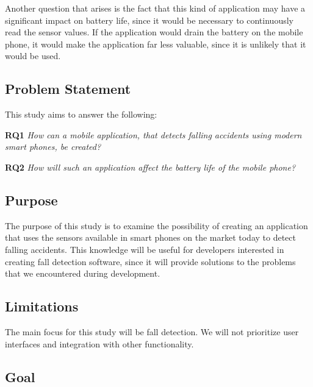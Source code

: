 \documentclass[12pt, a4paper, onecolumn]{article}
\begin{document}
		Another question that arises is the fact that this kind of application may have a significant impact on battery life, since it would be necessary to continuously read the sensor values. If the application would drain the battery on the mobile phone, it would make the application far less valuable, since it is unlikely that it would be used.
		
		\subsection{Problem Statement}
		
		This study aims to answer the following:
		
		\textbf{RQ1} \textit{How can a mobile application, that detects falling accidents using modern smart phones, be created?}
		
		\textbf{RQ2} \textit{How will such an application affect the battery life of the mobile phone?}
		
		
		\subsection{Purpose}
		
		The purpose of this study is to examine the possibility of creating an application that uses the sensors available in smart phones on the market today to detect falling accidents. This knowledge will be useful for developers interested in creating fall detection software, since it will provide solutions to the problems that we encountered during development.
		
		\subsection{Limitations}

		The main focus for this study will be fall detection. We will not prioritize user interfaces and integration with other functionality.
		
		\subsection{Goal}
		
\end{document}
